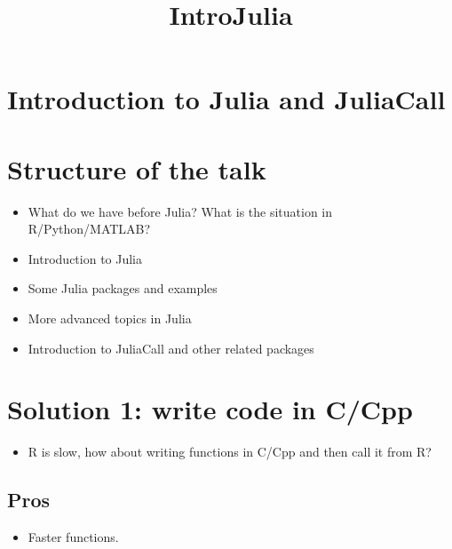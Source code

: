 \documentclass[11pt]{article}
\title{IntroJulia}
\providecommand{\tightlist}{%
      \setlength{\itemsep}{0pt}\setlength{\parskip}{0pt}}
\begin{document}
    
    
    \maketitle
    
    

    
    \hypertarget{introduction-to-julia-and-juliacall}{%
\section{Introduction to Julia and
JuliaCall}\label{introduction-to-julia-and-juliacall}}

    \hypertarget{structure-of-the-talk}{%
\section{Structure of the talk}\label{structure-of-the-talk}}

\begin{itemize}
\item
  What do we have before Julia? What is the situation in
  R/Python/MATLAB?
\item
  Introduction to Julia
\item
  Some Julia packages and examples
\item
  More advanced topics in Julia
\item
  Introduction to JuliaCall and other related packages
\end{itemize}

    \hypertarget{solution-1-write-code-in-ccpp}{%
\section{Solution 1: write code in
C/Cpp}\label{solution-1-write-code-in-ccpp}}

\begin{itemize}
\tightlist
\item
  R is slow, how about writing functions in C/Cpp and then call it from
  R?
\end{itemize}

\hypertarget{pros}{%
\subsection{Pros}\label{pros}}

\begin{itemize}
\tightlist
\item
  Faster functions.
\end{itemize}
\end{document}
